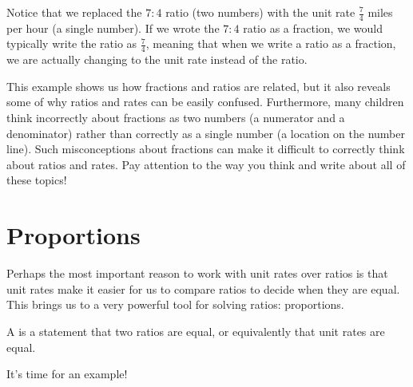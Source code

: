 \documentclass{ximera}
\begin{document}
\begin{example}
Notice that we replaced the $7:4$ ratio (two numbers) with the unit rate $\frac{7}{4}$ miles per hour (a single number). If we wrote the $7:4$ ratio as a fraction, we would typically write the ratio as $\frac{7}{4}$, meaning that when we write a ratio as a fraction, we are actually changing to the unit rate instead of the ratio.
\end{example}

This example shows us how fractions and ratios are related, but it also reveals some of why ratios and rates can be easily confused. Furthermore, many children think incorrectly about fractions as two numbers (a numerator and a denominator) rather than correctly as a single number (a location on the number line). Such misconceptions about fractions can make it difficult to correctly think about ratios and rates. Pay attention to the way you think and write about all of these topics!


\section{Proportions}

Perhaps the most important reason to work with unit rates over ratios is that unit rates make it easier for us to compare ratios to decide when they are equal. This brings us to a very powerful tool for solving ratios: proportions.

\begin{definition}
A  is a statement that two ratios are equal, or equivalently that unit rates are equal. 
\end{definition}

It's time for an example!
\end{document}
